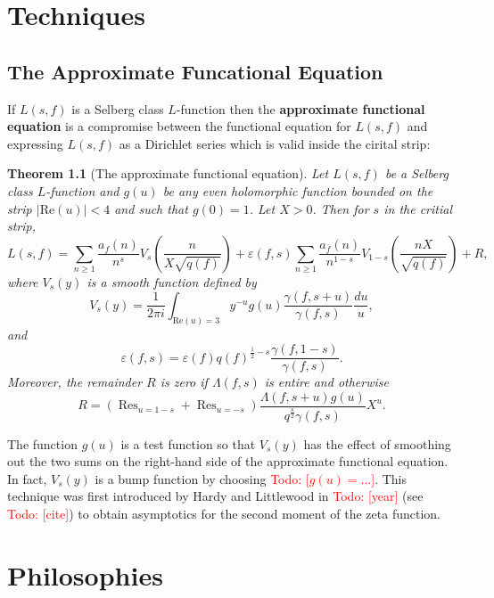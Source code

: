 \documentclass[12pt]{book}
\newtheorem{theorem}{Theorem}[section]
\theoremstyle{definition}\newframedtheorem{method}{Method}
\newcommand{\g}{\gamma}
\renewcommand{\L}{\Lambda}
\newcommand{\e}{\varepsilon}
\newcommand{\<}{\langle}
\renewcommand{\>}{\rangle}
\newcommand{\conj}{\overline}
\DeclareMathOperator*{\Res}{\mathrm{Res}}
\renewcommand{\Re}{\mathrm{Re}}
\newcommand{\todo}[1]{\textcolor{red}{\sf Todo: [#1]}}
\begin{document}
\chapter{Techniques}
  \section{The Approximate Funcational Equation}
    If $L(s,f)$ is a Selberg class $L$-function then the \textbf{approximate functional equation} is a compromise between the functional equation for $L(s,f)$ and expressing $L(s,f)$ as a Dirichlet series which is valid inside the cirital strip:

    \begin{theorem}[The approximate functional equation]
      Let $L(s,f)$ be a Selberg class $L$-function and $g(u)$ be any even holomorphic function bounded on the strip $|\Re(u)| < 4$ and such that $g(0) = 1$. Let $X > 0$. Then for $s$ in the critial strip,
      \[
        L(s,f) = \sum_{n \ge 1}\frac{a_{f}(n)}{n^{s}}V_{s}\left(\frac{n}{X\sqrt{q(f)}}\right)+\e(f,s)\sum_{n \ge 1}\frac{a_{\conj{f}}(n)}{n^{1-s}}V_{1-s}\left(\frac{nX}{\sqrt{q(f)}}\right)+R,
      \]
      where $V_{s}(y)$ is a smooth function defined by
      \[
        V_{s}(y) = \frac{1}{2\pi i}\int_{\Re(u) = 3}y^{-u}g(u)\frac{\g(f,s+u)}{\g(f,s)}\frac{du}{u},
      \]
      and
      \[
        \e(f,s) = \e(f)q(f)^{\frac{1}{2}-s}\frac{\g(f,1-s)}{\g(f,s)}.
      \]
      Moreover, the remainder $R$ is zero if $\L(f,s)$ is entire and otherwise
      \[
        R = \left(\Res_{u = 1-s}+\Res_{u = -s}\right)\frac{\L(f,s+u)g(u)}{q^{\frac{s}{2}}\g(f,s)}X^{u}.
      \]
    \end{theorem}

    The function $g(u)$ is a test function so that $V_{s}(y)$ has the effect of smoothing out the two sums on the right-hand side of the approximate functional equation. In fact, $V_{s}(y)$ is a bump function by choosing \todo{$g(u) = ...$}. This technique was first introduced by Hardy and Littlewood in \todo{year} (see \todo{cite}) to obtain asymptotics for the second moment of the zeta function.

\chapter{Philosophies}
\end{document}
